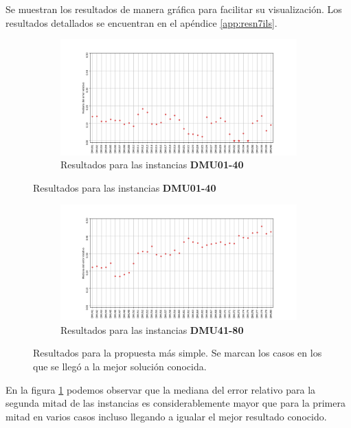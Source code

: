 Se muestran los resultados de manera gráfica para facilitar su visualización. Los resultados detallados se encuentran en el apéndice \ref{app:resn7ils}. 

\begin{figure}[H]
    \begin{subfigure}{\textwidth}
        \centering
        \includegraphics[scale=.65]{Imagenes/resn7ils1.png}
        \caption{Resultados para las instancias \textbf{DMU01-40}}
    \end{subfigure}
\end{figure}
\begin{figure}[H]\ContinuedFloat
    \begin{subfigure}{\textwidth}
        \centering
        \includegraphics[scale=.65]{Imagenes/resn7ils2.png}
        \caption{Resultados para las instancias \textbf{DMU41-80}}
    \end{subfigure}
    \caption{Resultados para la propuesta más simple. Se marcan los casos en los que se llegó a la mejor solución conocida.}
    \label{fig:PN7Cmax}
\end{figure}

En la figura \ref{fig:PN7Cmax} podemos observar que la mediana del error relativo para la segunda mitad de las instancias es considerablemente mayor que para la primera mitad en varios casos incluso llegando a igualar el mejor resultado conocido.

